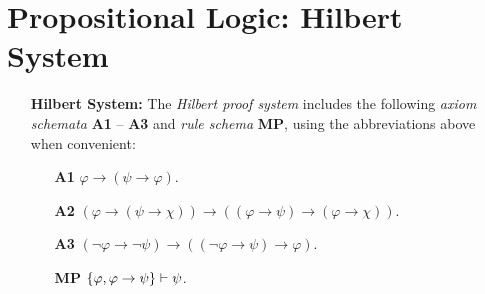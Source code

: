 \documentclass[a4paper, 11pt]{article} %
\begin{document}
\section*{\sc Propositional Logic: Hilbert System}

\begin{enumerate}[leftmargin=1.2in,labelsep=.15in] 
  \item[\bf Hilbert System:] The \textit{Hilbert proof system} includes the following \textit{axiom schemata} \textbf{A1} -- \textbf{A3} and \textit{rule schema} \textbf{MP}, using the abbreviations above when convenient:
    \begin{itemize}[leftmargin=.5in]
      \item[\bf A1] $\varphi \rightarrow (\psi \rightarrow \varphi)$.
      \item[\bf A2] $(\varphi \rightarrow (\psi \rightarrow \chi)) \rightarrow ((\varphi \rightarrow \psi) \rightarrow (\varphi \rightarrow \chi))$.
      \item[\bf A3] $(\neg\varphi \rightarrow \neg\psi) \rightarrow ((\neg\varphi \rightarrow \psi) \rightarrow \varphi)$.
      \item[\bf MP] $\lbrace\varphi, \varphi \rightarrow \psi\rbrace \vdash \psi$.

\end{itemize}
\end{enumerate}
\end{document}
